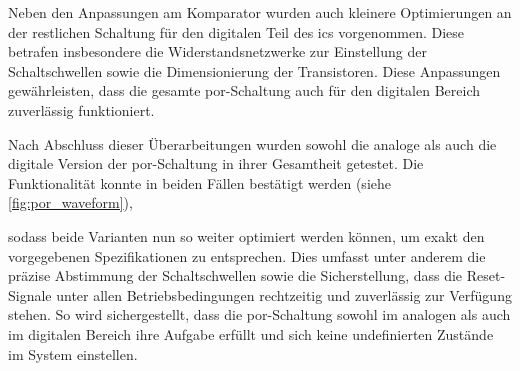 Neben den Anpassungen am Komparator wurden auch kleinere Optimierungen an der restlichen Schaltung für den digitalen Teil des \glspl{ic} vorgenommen. Diese betrafen insbesondere die Widerstandsnetzwerke zur Einstellung der Schaltschwellen sowie die Dimensionierung der Transistoren. Diese Anpassungen gewährleisten, dass die gesamte \gls{por}-Schaltung auch für den digitalen Bereich zuverlässig funktioniert. 

Nach Abschluss dieser Überarbeitungen wurden sowohl die analoge als auch die digitale Version der \gls{por}-Schaltung in ihrer Gesamtheit getestet. Die Funktionalität konnte in beiden Fällen bestätigt werden (siehe \autoref{fig:por_waveform}),

 sodass beide Varianten nun so weiter optimiert werden können, um exakt den vorgegebenen Spezifikationen zu entsprechen. Dies umfasst unter anderem die präzise Abstimmung der Schaltschwellen sowie die Sicherstellung, dass die Reset-Signale unter allen Betriebsbedingungen rechtzeitig und zuverlässig zur Verfügung stehen. So wird sichergestellt, dass die \gls{por}-Schaltung sowohl im analogen als auch im digitalen Bereich ihre Aufgabe erfüllt und sich keine undefinierten Zustände im System einstellen. 